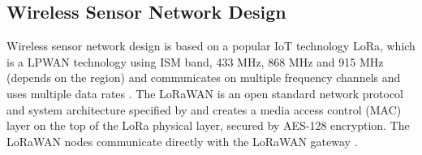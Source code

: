 \subsection{Wireless Sensor Network Design}
Wireless sensor network design is based on a popular IoT technology LoRa, which is a LPWAN technology using ISM band, 433 MHz, 868 MHz and 915 MHz (depends on the region) and communicates on multiple frequency channels and uses multiple data rates \cite{LoRaWAN Evaluation for IoT Communications}.
The LoRaWAN is an open standard network protocol and system architecture specified by \cite{LoRaWAN specification} and creates a media access control (MAC) layer on the top of the LoRa physical layer, secured by AES-128 encryption.
The LoRaWAN nodes communicate directly with the LoRaWAN gateway \cite{Internet of Things (IoT) using LoRa technology}.


